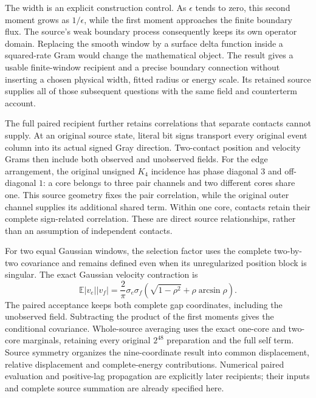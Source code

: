 The width is an explicit construction control. As $\epsilon$ tends to zero, this second moment grows as $1/\epsilon$, while the first moment approaches the finite boundary flux. The source's weak boundary process consequently keeps its own operator domain. Replacing the smooth window by a surface delta function inside a squared-rate Gram would change the mathematical object. The result gives a usable finite-window recipient and a precise boundary connection without inserting a chosen physical width, fitted radius or energy scale. Its retained source supplies all of those subsequent questions with the same field and counterterm account.

The full paired recipient further retains correlations that separate contacts cannot supply. At an original source state, literal bit signs transport every original event column into its actual signed Gray direction. Two-contact position and velocity Grams then include both observed and unobserved fields. For the edge arrangement, the original unsigned $K_4$ incidence has phase diagonal $3$ and off-diagonal $1$: a core belongs to three pair channels and two different cores share one. This source geometry fixes the pair correlation, while the original outer channel supplies its additional shared term. Within one core, contacts retain their complete sign-related correlation. These are direct source relationships, rather than an assumption of independent contacts.

For two equal Gaussian windows, the selection factor uses the complete two-by-two covariance and remains defined even when its unregularized position block is singular. The exact Gaussian velocity contraction is
\begin{equation}
 \mathbb E|v_e||v_f|=\frac2\pi\sigma_e\sigma_f
 \left(\sqrt{1-\rho^2}+\rho\arcsin\rho\right).
\end{equation}
The paired acceptance keeps both complete gap coordinates, including the unobserved field. Subtracting the product of the first moments gives the conditional covariance. Whole-source averaging uses the exact one-core and two-core marginals, retaining every original $2^{48}$ preparation and the full self term. Source symmetry organizes the nine-coordinate result into common displacement, relative displacement and complete-energy contributions. Numerical paired evaluation and positive-lag propagation are explicitly later recipients; their inputs and complete source summation are already specified here.

